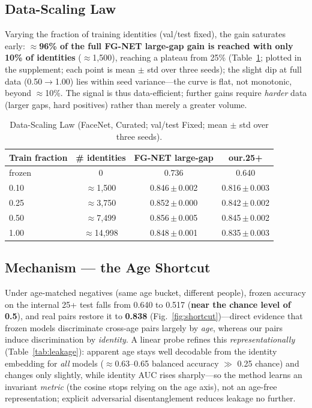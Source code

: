 \documentclass[journal]{IEEEtran}
\begin{document}
\subsection{Data-Scaling Law}\label{sec:res-scaling}
Varying the fraction of training identities (val/test fixed), the gain saturates early: \textbf{$\approx$96\% of the full FG-NET large-gap gain is reached with only 10\% of identities} ($\approx$1{,}500), reaching a plateau from 25\% (Table~\ref{tab:scaling}; plotted in the supplement; each point is mean $\pm$ std over three seeds); the slight dip at full data (0.50$\rightarrow$1.00) lies within seed variance---the curve is flat, not monotonic, beyond $\approx$10\%. The signal is thus data-efficient; further gains require \emph{harder} data (larger gaps, hard positives) rather than merely a greater volume.

\begin{table}[!t]
\renewcommand{\arraystretch}{1.2}
\caption{Data-Scaling Law (FaceNet, Curated; val/test Fixed; mean $\pm$ std over three seeds).}
\label{tab:scaling}
\centering
\footnotesize
\begin{tabular}{@{}lccc@{}}
\toprule
Train fraction & \# identities & FG-NET large-gap & our.25+ \\
\midrule
frozen & 0 & 0.736 & 0.640 \\
0.10 & $\approx$1{,}500 & 0.846\,$\pm$\,0.002 & 0.816\,$\pm$\,0.003 \\
0.25 & $\approx$3{,}750 & 0.852\,$\pm$\,0.000 & 0.842\,$\pm$\,0.002 \\
0.50 & $\approx$7{,}499 & 0.856\,$\pm$\,0.005 & 0.845\,$\pm$\,0.002 \\
1.00 & $\approx$14{,}998 & 0.848\,$\pm$\,0.001 & 0.835\,$\pm$\,0.003 \\
\bottomrule
\end{tabular}
\end{table}

\subsection{Mechanism --- the Age Shortcut}\label{sec:res-shortcut}
Under age-matched negatives (same age bucket, different people), frozen accuracy on the internal 25+ test falls from 0.640 to 0.517 (\textbf{near the chance level of 0.5}), and real pairs restore it to \textbf{0.838} (Fig.~\ref{fig:shortcut})---direct evidence that frozen models discriminate cross-age pairs largely by \emph{age}, whereas our pairs induce discrimination by \emph{identity}. A linear probe refines this \emph{representationally} (Table~\ref{tab:leakage}): apparent age stays well decodable from the identity embedding for \emph{all} models ($\approx$0.63--0.65 balanced accuracy $\gg$ 0.25 chance) and changes only slightly, while identity AUC rises sharply---so the method learns an invariant \emph{metric} (the cosine stops relying on the age axis), not an age-free representation; explicit adversarial disentanglement reduces leakage no further.
\end{document}
